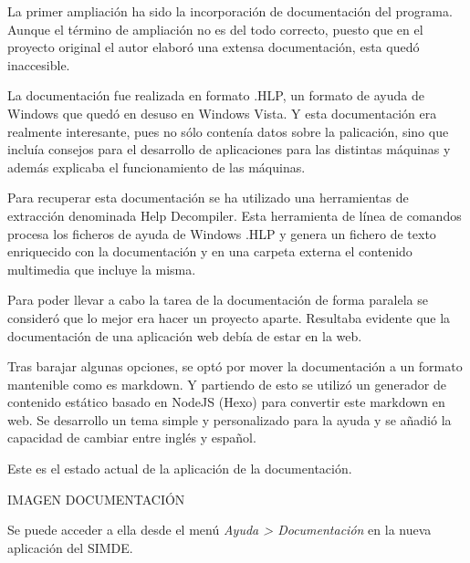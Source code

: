 
La primer ampliación ha sido la incorporación de documentación del programa. Aunque el
término de ampliación no es del todo correcto, puesto que en el proyecto original el autor
elaboró una extensa documentación, esta quedó inaccesible.

\bigskip
La documentación fue realizada en formato .HLP, un formato de ayuda de Windows que quedó
en desuso en Windows Vista. Y esta documentación era realmente interesante, pues no sólo
contenía datos sobre la palicación, sino que incluía consejos para el desarrollo de 
aplicaciones para las distintas máquinas y además explicaba el funcionamiento de las máquinas.

\bigskip
Para recuperar esta documentación se ha utilizado una herramientas de extracción denominada
Help Decompiler. Esta herramienta de línea de comandos procesa los ficheros de ayuda de
Windows .HLP y genera un fichero de texto enriquecido con la documentación y en una carpeta
externa el contenido multimedia que incluye la misma.

\bigskip
Para poder llevar a cabo la tarea de la documentación de forma paralela se consideró que lo mejor era
hacer un proyecto aparte. Resultaba evidente que la documentación de una aplicación web debía de estar en la
web. 

\bigskip
Tras barajar algunas opciones, se optó por mover la documentación a un formato mantenible como 
es markdown. Y partiendo de esto se utilizó un generador de contenido estático basado en NodeJS (Hexo)
para convertir este markdown en web. Se desarrollo un tema simple y personalizado para la ayuda y se 
añadió la capacidad de cambiar entre inglés y español.

\bigskip
Este es el estado actual de la aplicación de la documentación.

    IMAGEN DOCUMENTACIÓN

\bigskip
Se puede acceder a ella desde el menú \textit{Ayuda > Documentación} en la nueva aplicación del SIMDE.